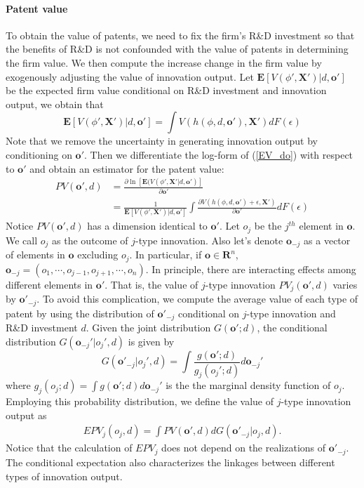 \paragraph{Patent value}
To obtain the value of patents, we need to fix the firm's R\&D investment so that the benefits of R\&D is not confounded with the value of patents in determining the firm value. We then compute the increase change in the firm value by exogenously adjusting the value of innovation output. Let $\mathbf{E}[V(\phi',\mathbf{X}')|d,\mathbf{o'}]$ be the expected firm value conditional on R\&D investment and innovation output, we obtain that
\begin{equation}\label{EV_do}
    \mathbf{E}[V(\phi',\mathbf{X}')|d,\mathbf{o'}] = \int V(h(\phi,d,\mathbf{o}'),\mathbf{X}')dF(\epsilon)
\end{equation}
Note that we remove the uncertainty in generating innovation output by conditioning on $\mathbf{o'}$. Then we differentiate the log-form of (\ref{EV_do}) with respect to $\mathbf{o}'$ and obtain an estimator for the patent value:
\begin{align}
    PV(\mathbf{o}', d) &=  \frac{\partial \ln [\mathbf{E}(V(\phi',\mathbf{X}'|d,\mathbf{o}')]}{\partial \mathbf{o'}} \\
                     &=  \frac{1}{\mathbf{E} [V(\phi',\mathbf{X}')|d, \mathbf{o}']} \int\frac{\partial V(h(\phi,d,\mathbf{o}')+\epsilon,\mathbf{X}')}{\partial \mathbf{o}'}dF(\epsilon) \nonumber
\end{align}
Notice $PV(\mathbf{o}',d)$ has a dimension identical to $\mathbf{o}'$. Let $o_{j}$ be the $j^{th}$ element in $\mathbf{o}$. We call $o_j$ as the outcome of $j$-type innovation. Also let's denote $\mathbf{o}_{-j}$ as a vector of elements in $\mathbf{o}$ excluding $o_j$. In particular, if $\mathbf{o}\in \mathbf{R}^n$, $\mathbf{o}_{-j}=(o_1,\cdots,o_{j-1},o_{j+1},\cdots,o_n)$. In principle, there are interacting effects among different elements in $\mathbf{o}'$. That is, the value of $j$-type innovation $PV_j(\mathbf{o}',d)$ varies by $\mathbf{o}'_{-j}$. To avoid this complication, we compute the average value of each type of patent by using the distribution of $\mathbf{o}'_{-j}$ conditional on $j$-type innovation and R\&D investment $d$. Given the joint distribution $G(\mathbf{o}';d)$, the conditional distribution $G(\mathbf{o}_{-j}'|o_j',d)$ is given by
\begin{equation*}
    G(\mathbf{o}'_{-j}|o_j',d) =\int \frac{g(\mathbf{o}';d)}{g_j(o_j';d)}d\mathbf{o}_{-j}'
\end{equation*} 
where $g_j(o_j;d)=\int g(\mathbf{o}';d)d\mathbf{o}_{-j}'$ is the the marginal density function of $o_j$. Employing this probability distribution, we define the value of $j$-type innovation output as
\begin{align}
    EPV_j(o_j,d) = \int PV(\mathbf{o}',d)dG(\mathbf{o}'_{-j}|o_j,d).
\end{align}
Notice that the calculation of $EPV_j$ does not depend on the realizations of $\mathbf{o}'_{-j}$. The conditional expectation also characterizes the linkages between different types of innovation output. 
